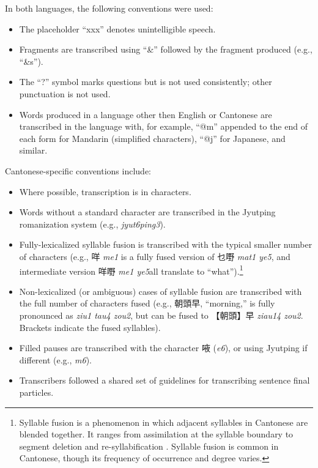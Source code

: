 In both languages, the following conventions were used:
\begin{itemize}
 \item The placeholder ``xxx'' denotes unintelligible speech.
 \item Fragments are transcribed using ``\&'' followed by the fragment produced (e.g., ``\&s'').
 \item The ``?'' symbol marks questions but is not used consistently; other punctuation is not used.
\item Words produced in a language other then English or Cantonese are transcribed in the language with, for example, ``@m'' appended to the end of each form for Mandarin (simplified characters), ``@j'' for Japanese, and similar. 

\end{itemize}

Cantonese-specific conventions include:
\begin{itemize}
 \item Where possible, transcription is in characters.
 \item Words without a standard character are transcribed in the Jyutping romanization system (e.g., \textit{jyut6ping3}).
 \item Fully-lexicalized syllable fusion is transcribed with the typical smaller number of characters (e.g., 咩 \textit{me1} is a fully fused version of 乜嘢 \textit{mat1 ye5}, and intermediate version 咩嘢 \textit{me1 ye5}\textemdash all translate to ``what'').\footnote{Syllable fusion is a phenomenon in which adjacent syllables in Cantonese are blended together. It ranges from assimilation at the syllable boundary to segment deletion and re-syllabification \citep{wong_2006_fusion}. Syllable fusion is common in Cantonese, though its frequency of occurrence and degree varies.}
 \item Non-lexicalized (or ambiguous) cases of syllable fusion are transcribed with the full number of characters fused (e.g., 朝頭早, ``morning,'' is fully pronounced as \textit{ziu1 tau4 zou2}, but can be fused to 【朝頭】早 \textit{ziau14 zou2}. Brackets indicate the fused syllables).
 \item Filled pauses are transcribed with the character 㖡 (\textit{e6}), or using Jyutping if different (e.g., \textit{m6}). 
 \item Transcribers followed a shared set of guidelines for transcribing sentence final particles.
\end{itemize}


